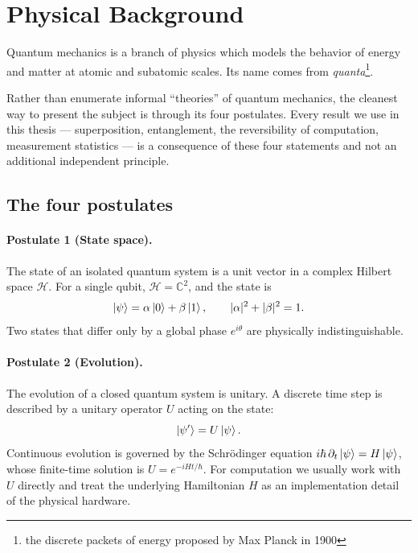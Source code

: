 \setcounter{equation}{0}
\section{Physical Background}

Quantum mechanics is a branch of physics which models the behavior of energy and matter at atomic and subatomic scales. Its name comes from \emph{quanta}\footnote{the discrete packets of energy proposed by Max Planck in 1900}.

Rather than enumerate informal ``theories'' of quantum mechanics, the cleanest way to present the subject is through its four postulates. Every result we use in this thesis --- superposition, entanglement, the reversibility of computation, measurement statistics --- is a consequence of these four statements and not an additional independent principle.

\subsection{The four postulates}

\paragraph{Postulate 1 (State space).} The state of an isolated quantum system is a unit vector in a complex Hilbert space $\mathcal{H}$. For a single qubit, $\mathcal{H} = \mathbb{C}^2$, and the state is
\begin{equation}
\mathinner{|{\psi}\rangle} = \alpha\mathinner{|{0}\rangle} + \beta\mathinner{|{1}\rangle}, \qquad |\alpha|^2 + |\beta|^2 = 1.
\end{equation}
Two states that differ only by a global phase $e^{i\theta}$ are physically indistinguishable.

\paragraph{Postulate 2 (Evolution).} The evolution of a closed quantum system is unitary. A discrete time step is described by a unitary operator $U$ acting on the state:
\begin{equation}
\mathinner{|{\psi'}\rangle} = U\mathinner{|{\psi}\rangle}.
\end{equation}
Continuous evolution is governed by the Schr\"{o}dinger equation $i\hbar\,\partial_t\mathinner{|{\psi}\rangle} = H\mathinner{|{\psi}\rangle}$, whose finite-time solution is $U = e^{-iHt/\hbar}$. For computation we usually work with $U$ directly and treat the underlying Hamiltonian $H$ as an implementation detail of the physical hardware.

